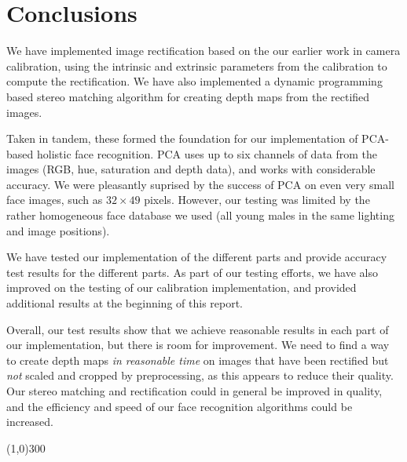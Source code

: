 
\section{Conclusions}
\label{sec:conclusions}
We have implemented image rectification based on the our earlier work
in camera calibration, using the intrinsic and extrinsic parameters from the
calibration to compute the rectification. We have also implemented a
dynamic programming based stereo matching algorithm for creating depth maps from
the rectified images.

Taken in tandem, these formed the foundation for our
implementation of PCA-based holistic face
recognition. PCA uses up to six channels of data from the images (RGB, hue,
saturation and depth data), and works with considerable accuracy. We were pleasantly
suprised by the success of PCA on even very small face images, such as $32\times49$ pixels. However, our testing
was limited by the rather homogeneous face database we used (all young males in the
same lighting and image positions).

We have tested our implementation of the different parts and provide accuracy
test results for the different parts. As part of our testing efforts, we have
also improved on the testing of our calibration implementation, and provided
additional results at the beginning of this report.

Overall, our test results show that we achieve reasonable results in each part of our
implementation, but there is room for improvement. We need to find a way to create depth maps
\emph{in reasonable time} on images that have been rectified but \emph{not} scaled and cropped
by preprocessing, as this appears to reduce their quality. Our stereo matching and rectification could in general be improved in quality, and the efficiency and speed of our face recognition algorithms could be increased.

\begin{center}
\line(1,0){300}

\end{center}

